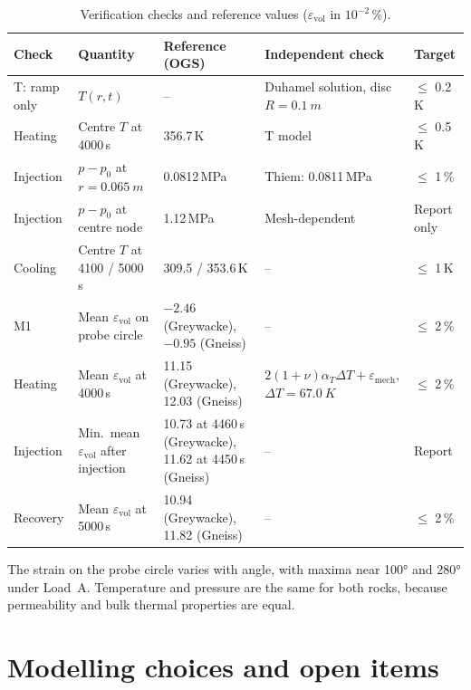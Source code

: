 \documentclass[11pt,a4paper]{article}
\begin{document}
\begin{table}[htbp]
\centering
\caption{Verification checks and reference values ($\varepsilon_\mathrm{vol}$ in $10^{-2}$\,\%).}
\label{tab:checks}
\small
\begin{tabularx}{\textwidth}{@{}lLLLl@{}}
\toprule
Check & Quantity & Reference (OGS) & Independent check & Target \\
\midrule
T: ramp only & $T(r,t)$ & -- & Duhamel solution, disc $R=\SI{0.1}{m}$ & $\le$ 0.2\,K \\
Heating   & Centre $T$ at 4000\,s & 356.7\,K & T model & $\le$ 0.5\,K \\
Injection & $p-p_0$ at $r=\SI{0.065}{m}$ & 0.0812\,MPa & Thiem: 0.0811\,MPa & $\le$ 1\,\% \\
Injection & $p-p_0$ at centre node & 1.12\,MPa & Mesh-dependent & Report only \\
Cooling   & Centre $T$ at 4100 / 5000\,s & 309.5 / 353.6\,K & -- & $\le$ 1\,K \\
M1        & Mean $\varepsilon_\mathrm{vol}$ on probe circle & $-2.46$ (Greywacke), $-0.95$ (Gneiss) & -- & $\le$ 2\,\% \\
Heating   & Mean $\varepsilon_\mathrm{vol}$ at 4000\,s & 11.15 (Greywacke), 12.03 (Gneiss) & $2(1+\nu)\alpha_T\Delta T+\varepsilon_\mathrm{mech}$, $\Delta T=\SI{67.0}{K}$ & $\le$ 2\,\% \\
Injection & Min.\ mean $\varepsilon_\mathrm{vol}$ after injection & 10.73 at 4460\,s (Greywacke), 11.62 at 4450\,s (Gneiss) & -- & Report \\
Recovery  & Mean $\varepsilon_\mathrm{vol}$ at 5000\,s & 10.94 (Greywacke), 11.82 (Gneiss) & -- & $\le$ 2\,\% \\
\bottomrule
\end{tabularx}
\end{table}

The strain on the probe circle varies with angle, with maxima near \ang{100}
and \ang{280} under Load~A. Temperature and pressure are the same for both
rocks, because permeability and bulk thermal properties are equal.

\section{Modelling choices and open items}
\label{sec:open}
\end{document}
